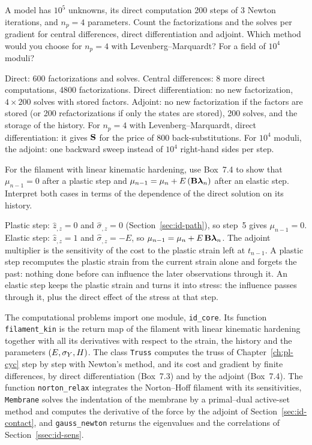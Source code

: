 \label{exo:id-q-cost}
%
A model has $10^5$ unknowns, its direct computation 200 steps of 3 Newton
iterations, and $n_p=4$ parameters. Count the factorizations and the solves per
gradient for central differences, direct differentiation and adjoint. Which
method would you choose for $n_p=4$ with Levenberg--Marquardt? For a field of
$10^4$ moduli?
\begin{solution}
Direct: 600 factorizations and solves. Central differences: 8 more direct
computations, 4800 factorizations. Direct differentiation: no new factorization,
$4\times200$ solves with stored factors. Adjoint: no new factorization if the factors
are stored (or 200 refactorizations if only the states are stored), 200 solves,
and the storage of the history. For $n_p=4$ with Levenberg--Marquardt, direct
differentiation: it gives $\mathbf{S}$ for the price of 800 back-substitutions. For
$10^4$ moduli, the adjoint: one backward sweep instead of $10^4$ right-hand sides
per step.
\end{solution}

\label{exo:id-q-memory}
%
For the filament with linear kinematic hardening, use Box~7.4 to show that
$\mu_{n-1}=0$ after a plastic step and $\mu_{n-1}=\mu_n+E\,(\mathbf{B}\boldsymbol\lambda_n)$
after an elastic step. Interpret both cases in terms of the dependence of the
direct solution on its history.
\begin{solution}
Plastic step: $\hat z_{,z}=0$ and $\hat\sigma_{,z}=0$ (Section~\ref{sec:id-path}), so step~5
gives $\mu_{n-1}=0$. Elastic step: $\hat z_{,z}=1$ and $\hat\sigma_{,z}=-E$, so
$\mu_{n-1}=\mu_n+E\,\mathbf{B}\boldsymbol\lambda_n$. The adjoint multiplier is the sensitivity of
the cost to the plastic strain left at $t_{n-1}$. A plastic step recomputes the
plastic strain from the current strain alone and forgets the past: nothing done
before can influence the later observations through it. An elastic step keeps the
plastic strain and turns it into stress: the influence passes through it, plus
the direct effect of the stress at that step.
\end{solution}

\label{sec:id-aux}%
%
The computational problems import one module, \texttt{id\_core}. Its function
\texttt{filament\_kin} is the return map of the filament with linear kinematic
hardening together with all its derivatives with respect to the strain, the
history and the parameters $(E,\sigma_{Y},H)$. The class \texttt{Truss} computes the truss
of Chapter~\ref{ch:pl-cyc} step by step with Newton's method, and its cost and
gradient by finite differences, by direct differentiation (Box~7.3) and by the
adjoint (Box~7.4). The function \texttt{norton\_relax} integrates the Norton--Hoff
filament with its sensitivities, \texttt{Membrane} solves the indentation of the
membrane by a primal--dual active-set method and computes the derivative of the
force by the adjoint of Section~\ref{sec:id-contact}, and \texttt{gauss\_newton}
returns the eigenvalues and the correlations of Section~\ref{ssec:id-sens}.


